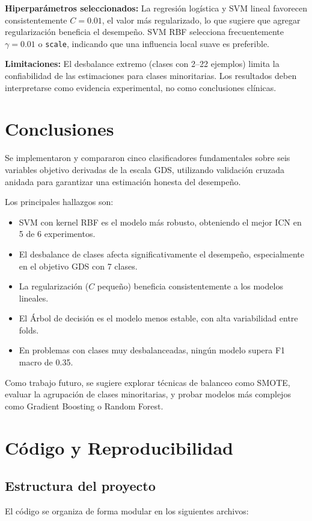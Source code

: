 \documentclass[conference]{IEEEtran}
\begin{document}
\noindent \textbf{Hiperparámetros seleccionados:} La regresión logística y SVM lineal favorecen consistentemente \(C = 0.01\), el valor más regularizado, lo que sugiere que agregar regularización beneficia el desempeño. SVM RBF selecciona frecuentemente \(\gamma = 0.01\) o \texttt{scale}, indicando que una influencia local suave es preferible.

\noindent \textbf{Limitaciones:} El desbalance extremo (clases con 2--22 ejemplos) limita la confiabilidad de las estimaciones para clases minoritarias. Los resultados deben interpretarse como evidencia experimental, no como conclusiones clínicas.

\section{Conclusiones}

Se implementaron y compararon cinco clasificadores fundamentales sobre seis variables objetivo derivadas de la escala GDS, utilizando validación cruzada anidada para garantizar una estimación honesta del desempeño.

Los principales hallazgos son:
\begin{itemize}
  \item SVM con kernel RBF es el modelo más robusto, obteniendo el mejor ICN en 5 de 6 experimentos.
  \item El desbalance de clases afecta significativamente el desempeño, especialmente en el objetivo GDS con 7 clases.
  \item La regularización (\(C\) pequeño) beneficia consistentemente a los modelos lineales.
  \item El Árbol de decisión es el modelo menos estable, con alta variabilidad entre folds.
  \item En problemas con clases muy desbalanceadas, ningún modelo supera F1 macro de 0.35.
\end{itemize}

Como trabajo futuro, se sugiere explorar técnicas de balanceo como SMOTE, evaluar la agrupación de clases minoritarias, y probar modelos más complejos como Gradient Boosting o Random Forest.

\section{Código y Reproducibilidad}

\subsection{Estructura del proyecto}
El código se organiza de forma modular en los siguientes archivos:
\end{document}
